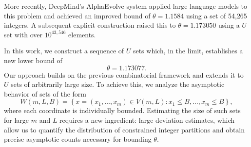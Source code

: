 \documentclass[12 pt]{article}
\begin{document}
More recently, DeepMind's AlphaEvolve system \cite{deepmind} applied large language models to this problem and achieved an improved bound of \( \theta = 1.1584 \) using a set of 54{,}265 integers. A subsequent explicit construction \cite{gerbicz2025} raised this to \( \theta = 1.173050 \) using a \( U \) set with over $10^{43{,}546}$ elements.

In this work, we construct a sequence of \( U \) sets which, in the limit, establishes a new lower bound of
\[
\theta = 1.173077.
\]
Our approach builds on the previous combinatorial framework and extends it to \( U \) sets of arbitrarily large size. To achieve this, we analyze the asymptotic behavior of sets of the form
\[
W(m, L, B) = \left\{ x = (x_1, \ldots, x_m) \in V(m, L): x_1 \leq B, \ldots, x_m \leq B \right\},
\]
where each coordinate is individually bounded. Estimating the size of such sets for large \( m \) and \( L \) requires a new ingredient: large deviation estimates, which allow us to quantify the distribution of constrained integer partitions and obtain precise asymptotic counts necessary for bounding \( \theta \).
\end{document}
